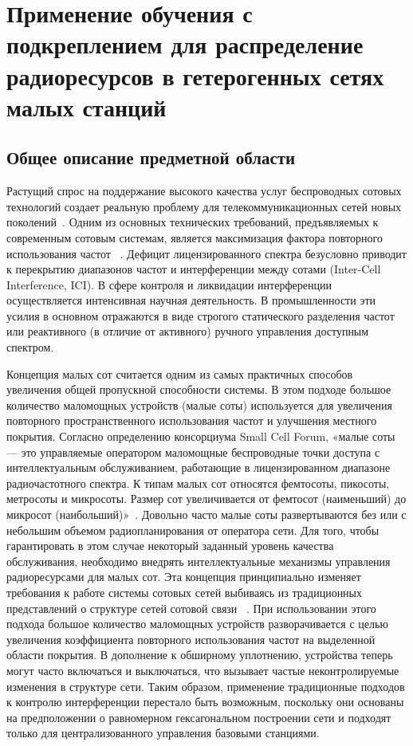 \chapter{Применение обучения с подкреплением для распределение радиоресурсов в гетерогенных сетях малых станций} \label{chapt2}

\section{Общее описание предметной области} \label{sect2_1}

Растущий спрос на поддержание высокого качества услуг беспроводных сотовых технологий создает реальную проблему для телекоммуникационных сетей новых поколений~\cite{TS36.300}. Одним из основных технических требований, предъявляемых к современным сотовым системам, является максимизация фактора повторного использования частот ~\cite{M.1645}. Дефицит лицензированного спектра безусловно приводит к перекрытию диапазонов частот и интерференции между сотами (Inter-Cell Interference, ICI). В сфере контроля и ликвидации интерференции осуществляется интенсивная научная деятельность. В промышленности эти усилия в основном отражаются в виде строгого статического разделения частот или реактивного (в отличие от активного) ручного управления доступным спектром.

Концепция малых сот считается одним из самых практичных способов увеличения общей пропускной способности системы. В этом подходе большое количество маломощных устройств (малые соты) используется для увеличения повторного пространственного использования частот и улучшения местного покрытия. Согласно определению консорциума Small Cell Forum, «малые соты — это управляемые оператором маломощные беспроводные точки доступа с интеллектуальным обслуживанием, работающие в лицензированном диапазоне радиочастотного спектра. К типам малых сот относятся фемтосоты, пикосоты, метросоты и микросоты. Размер сот увеличивается от фемтосот (наименьший) до микросот (наибольший)»~\cite{6171992}. Довольно часто малые соты развертываются без или с небольшим объемом радиопланирования от оператора сети. Для того, чтобы гарантировать в этом случае некоторый заданный уровень качества обслуживания, необходимо внедрять интеллектуальные механизмы управления радиоресурсами для малых сот. Эта концепция принципиально изменяет требования к работе системы сотовых сетей выбиваясь из традиционных представлений о структуре сетей сотовой связи ~\cite{6211486}. При использовании этого подхода большое количество маломощных устройств разворачивается с целью увеличения коэффициента повторного использования частот на выделенной области покрытия. В дополнение к обширному уплотнению, устройства теперь могут часто включаться и выключаться, что вызывает частые неконтролируемые изменения в структуре сети. Таким образом, применение традиционные подходов к контролю интерференции перестало быть возможным, поскольку они основаны на предположении о равномерном гексагональном построении сети и подходят только для централизованного управления базовыми станциями.

